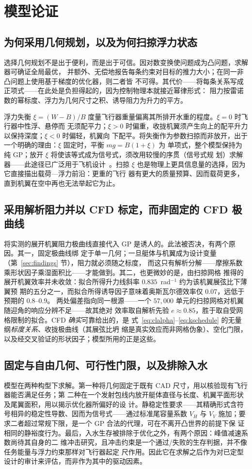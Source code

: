 \documentclass[a4paper,10pt,twocolumn]{ctexart}
\begin{document}
\section{模型论证}\label{sec:justify}

\subsection{为何采用几何规划，以及为何扫掠浮力状态}
选择几何规划不是出于便利，而是出于可信。因对数变换使问题成为凸问题，求解器可确证全局最优，
并额外、无偿地报告每条约束对目标的推力大小；在同一非凸问题上使用基于梯度的优化器，则二者皆
不可得。其代价——将每条关系写成正项式——在此处是负担得起的，因为控制物理本就接近幂律形式：
阻力按雷诺数的幂标度、浮力为几何尺寸之积、诱导阻力为升力的平方。

浮力失衡 $\xi=(W-B)/B$ 度量飞行器重量偏离其所排开水重的程度。$\xi=0$ 时飞行器中性浮、悬停而
无须配平力；$\xi>0$ 时偏重，收拢机翼须产生向上的配平升力以保持深度；$\xi<0$ 时偏轻，机翼向
下配平。将失衡作为参数扫掠而非放开，出于一个明确的理由：$\xi$ 固定时，平衡 $mg=B(1+\xi)$ 为
单项式，整个模型保持为纯 GP；放开 $\xi$ 将使该等式成为信号式，须改用较慢的序贯（信号式规
划）求解器——此途径已广泛用于飞机设计~\cite{kirschen2018application}。扫掠 $\xi$ 也是物理上更具信息量的选择，因为它直接描出载荷—浮力前沿：更重的飞行
器有更大的质量预算、因而载荷更多，直到机翼在空中再也无法举起它为止。

\subsection{采用解析阻力并以 CFD 标定，而非固定的 CFD 极曲线}
将实测的展开机翼阻力极曲线直接代入 GP 是诱人的。此法被否决，有两个原因。其一，固定极曲线绑
定于单一几何；一旦艇体与机翼成为设计变量（第~\ref{sec:findings} 节），阻力就必须随之标度，
而这只有解析分解——摩擦系数乘形状因子乘湿面积比——才能做到。其二，也更微妙的是，由扫掠网格
推得的展开机翼效率并未收敛：拟合所得升力线斜率 $0.835$~rad$^{-1}$ 约为该机翼展弦比下薄翼预
期的五分之一，而拟合所得诱导因子意味着奥斯瓦尔德效率仅 $0.07$，远低于预期的 $0.8$--$0.9$。
两处偏差指向同一根源——一个 $57{,}000$ 单元的扫掠网格对机翼随迎角的响应分辨不足——故其绝对
效率取自解析先验 $e\approx0.85$，胜于取自受网格限制的拟合。CFD \emph{确实}可靠给出的，是
式~\eqref{eq:clalpha}--\eqref{eq:kschedule} 的无量纲\emph{标度关系}、收拢极曲线（其展弦比坍
缩是真实效应而非网格伪象）、空化门限，以及经交叉验证的形状因子；模型所用的正是这些。

\subsection{固定与自由几何、可行性门限，以及排除入水}
模型在两种构型下求解。第一种将几何固定于既有 CAD 尺寸，用以核验现有飞行器能否满足任务；第
二种在一个发射包线内放开艇体直径与长度、机翼平面形状及尾翼面积，用以揭示优化器所偏好的设
计。静稳定性要求——其精确形式含符号相异的稳定性导数、因而为信号式——通过标准尾容量系数
$V_H$ 与 $V_V$ 施加；要求二者超过常规下限，是一个 GP 合法的代理，可在不离开凸世界的前提下保
证相同的静裕度行为。最后，入水生存被排除于优化之外，有两个原因：峰值减速系数尚待其自身的二
维冲击研究，且冲击约束是一个通过/失败的生存判据，并不像任务能量与浮力约束那样对飞行器起定
尺作用。因此它在求解之后作为对已定型设计的审计来评估，而非作为其中的驱动因素。
\end{document}
